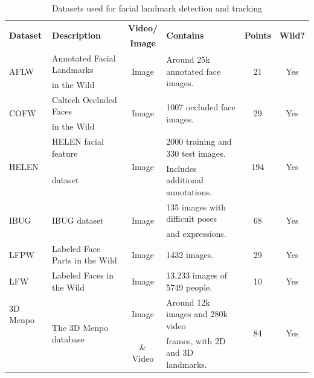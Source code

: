 \documentclass{llncs}
\begin{document}
\begin{table}[]
	\begin{center}%
		\caption{Datasets used for facial landmark detection and tracking}
		\begin{tabular}{|l|l|c|l|c|c|}
			\hline
			\multirow{2}{*}{\textbf{Dataset}}  & \multirow{2}{*}{\textbf{Description}} & \textbf{Video/} & \multirow{2}{*}{\textbf{Contains}}  & \multirow{2}{*}{\textbf{Points}} & \multirow{2}{*}{\textbf{Wild?}} \\ 
			 &  & \textbf{Image} &  &  & \\
			\hline
			
			\multirow{2}{*}{AFLW\cite{aflw}}     & Annotated Facial Landmarks & \multirow{2}{*}{Image} & \multirow{2}{*}{Around 25k annotated face images.} & \multirow{2}{*}{21} & \multirow{2}{*}{Yes} \\
			 & in the Wild & & & & \\ 
			\hline
			
			\multirow{2}{*}{COFW\cite{cofw}}  & Caltech Occluded Faces & \multirow{2}{*}{Image} & \multirow{2}{*}{1007 occluded face images.} & \multirow{2}{*}{29} & \multirow{2}{*}{Yes}            \\ 
		     & in the Wild & & & & \\
			\hline
			
			\multirow{2}{*}{HELEN\cite{helen}}  & HELEN facial feature & \multirow{2}{*}{Image} & 2000 training and 330 test images. & \multirow{2}{*}{194} & \multirow{2}{*}{Yes} \\ 
			 & dataset &  & Includes additional annotations. & &  \\
			\hline
			
			\multirow{2}{*}{IBUG\cite{ibug}} & \multirow{2}{*}{IBUG dataset} & \multirow{2}{*}{Image} & 135 images with difficult poses & \multirow{2}{*}{68} & \multirow{2}{*}{Yes}            \\ 
			 &  &  & and expressions. & &  \\
			\hline
			
			LFPW\cite{lfpw} & Labeled Face Parts in the Wild & Image & 1432 images. & 29 & Yes \\ 
			\hline
			
			LFW\cite{lfw}  & Labeled Faces in the Wild & Image & 13,233 images of 5749 people. & 10 & Yes \\ 
			\hline
			
			3D Menpo & \multirow{2}{*}{The 3D Menpo database} & Image & Around 12k images and 280k video & \multirow{2}{*}{84} & \multirow{2}{*}{Yes} \\ 
			\cite{3d_menpo} &  & \& Video & frames, with 2D and 3D landmarks. &  &  \\
			\hline
			

\end{tabular}
\end{center}
\end{table}
\end{document}
